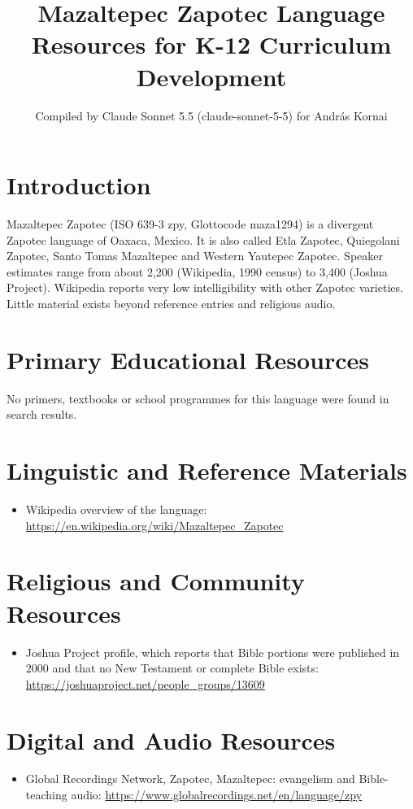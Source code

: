 \documentclass[12pt]{article}
\title{Mazaltepec Zapotec Language Resources for K-12 Curriculum Development}
\author{Compiled by Claude Sonnet 5.5 (claude-sonnet-5-5) for Andr\'as Kornai}
\date{}
\begin{document}
\maketitle

\section{Introduction}
Mazaltepec Zapotec (ISO 639-3 zpy, Glottocode maza1294) is a divergent Zapotec language of Oaxaca, Mexico. It is also called Etla Zapotec, Quiegolani Zapotec, Santo Tomas Mazaltepec and Western Yautepec Zapotec. Speaker estimates range from about 2,200 (Wikipedia, 1990 census) to 3,400 (Joshua Project). Wikipedia reports very low intelligibility with other Zapotec varieties. Little material exists beyond reference entries and religious audio.

\section{Primary Educational Resources}
No primers, textbooks or school programmes for this language were found in search results.

\section{Linguistic and Reference Materials}
\begin{itemize}
\item Wikipedia overview of the language: \url{https://en.wikipedia.org/wiki/Mazaltepec_Zapotec}
\end{itemize}

\section{Religious and Community Resources}
\begin{itemize}
\item Joshua Project profile, which reports that Bible portions were published in 2000 and that no New Testament or complete Bible exists: \url{https://joshuaproject.net/people_groups/13609}
\end{itemize}

\section{Digital and Audio Resources}
\begin{itemize}
\item Global Recordings Network, Zapotec, Mazaltepec: evangelism and Bible-teaching audio: \url{https://www.globalrecordings.net/en/language/zpy}
\end{itemize}
\end{document}
